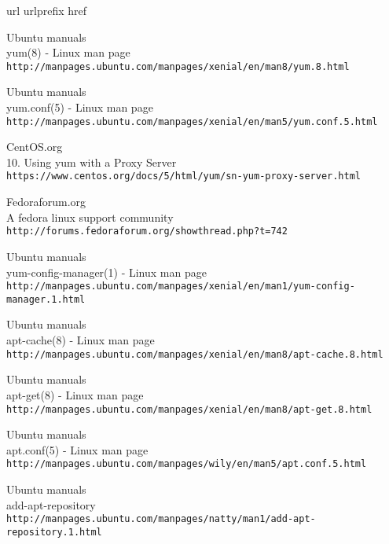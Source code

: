 \begin{thebibliography}{10}
\expandafter\ifx\csname url\endcsname\relax
  \def\url#1{\texttt{#1}}\fi
\expandafter\ifx\csname urlprefix\endcsname\relax\def\urlprefix{URL }\fi
\expandafter\ifx\csname href\endcsname\relax
  \def\href#1#2{#2} \def\path#1{#1}\fi

Ubuntu manuals\\
yum(8) - Linux man page\\
\url{http://manpages.ubuntu.com/manpages/xenial/en/man8/yum.8.html}

Ubuntu manuals\\
yum.conf(5) - Linux man page\\
  \url{http://manpages.ubuntu.com/manpages/xenial/en/man5/yum.conf.5.html}

CentOS.org\\
10. Using yum with a Proxy Server\\
  \url{https://www.centos.org/docs/5/html/yum/sn-yum-proxy-server.html}

Fedoraforum.org\\
A fedora linux support community\\
  \url{http://forums.fedoraforum.org/showthread.php?t=742}

Ubuntu manuals\\
yum-config-manager(1) - Linux man page\\
  \url{http://manpages.ubuntu.com/manpages/xenial/en/man1/yum-config-manager.1.html}

Ubuntu manuals\\
apt-cache(8) - Linux man page\\
  \url{http://manpages.ubuntu.com/manpages/xenial/en/man8/apt-cache.8.html}

Ubuntu manuals\\
apt-get(8) - Linux man page\\
  \url{http://manpages.ubuntu.com/manpages/xenial/en/man8/apt-get.8.html}

Ubuntu manuals\\
apt.conf(5) - Linux man page\\
  \url{http://manpages.ubuntu.com/manpages/wily/en/man5/apt.conf.5.html}

Ubuntu manuals\\
add-apt-repository\\
  \url{http://manpages.ubuntu.com/manpages/natty/man1/add-apt-repository.1.html}


\end{thebibliography}
